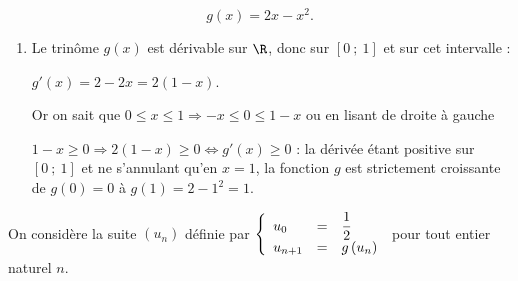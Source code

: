 \[g(x) = 2x - x^{2}.\]

\smallskip

\begin{enumerate}
\item 
Le trinôme $g(x)$ est dérivable sur $\R$, donc sur $[0~;~1]$ et sur cet intervalle :

$g'(x) = 2 - 2x = 2(1 - x)$.

Or on sait que $0\leqslant x \leqslant 1\Rightarrow - x \leqslant 0 \leqslant 1 - x$ ou en lisant de droite à gauche 

$1 - x \geqslant 0 \Rightarrow 2(1 - x) \geqslant 0 \iff g'(x) \geqslant 0$ : la dérivée étant positive sur $[0~;~1]$ et ne s'annulant qu'en $x = 1$, la fonction $g$ est strictement croissante de $g(0 ) = 0$ à $g(1) = 2 - 1^2 = 1$.
\end{enumerate}

On considère la suite $\left(u_{n}\right)$ définie par $\left\{\begin{array}{l c l}u_{0}&=&\dfrac{1}{2}\\ u_{n+1}&=&g\left(u_{n}\right)\end{array}\right.$ pour tout entier naturel $n$.

